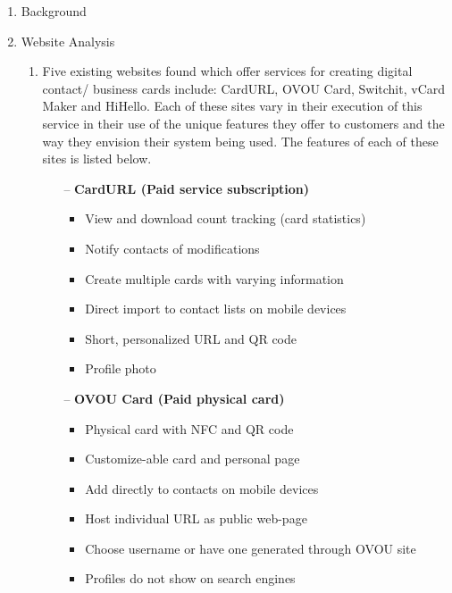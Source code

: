 \documentclass[12pt]{article}%
\begin{document}
\begin{enumerate}

    \item Background
    \item Website Analysis
        \begin{enumerate}
            \item Five existing websites found which offer services for creating digital contact/ business cards include: CardURL, OVOU Card, Switchit, vCard Maker and HiHello. Each of these sites vary in their execution of this service in their use of the unique features they offer to customers and the way they envision their system being used. The features of each of these sites is listed below.
            
            \begin{enumerate}
                \item [--] \textbf{CardURL (Paid service subscription)}
                
                \begin{itemize}
                    \item View and download count tracking (card statistics) 
                    \item Notify contacts of modifications
                    \item Create multiple cards with varying information
                    \item Direct import to contact lists on mobile devices
                    \item Short, personalized URL and QR code
                    \item Profile photo
                \end{itemize}
                
                \item [--] \textbf{OVOU Card (Paid physical card)}
                
                
                \begin{itemize}
                    \item Physical card with NFC and QR code
                    \item Customize-able card and personal page
                    \item Add directly to contacts on mobile devices
                    \item Host individual URL as public web-page
                    \item Choose username or have one generated through OVOU site
                    \item Profiles do not show on search engines
                \end{itemize}
                

\end{enumerate}
\end{enumerate}
\end{enumerate}
\end{document}
